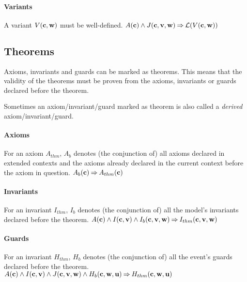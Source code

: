 \paragraph{Variants}
\label{well_definedness_of_variants}
A variant $V(\mathbf{c},\mathbf{w})$ must be well-defined.
%
  {$A(\mathbf{c}) \land J(\mathbf{c},\mathbf{v},\mathbf{w}) \mathbin\Rightarrow \mathcal{L}(V(\mathbf{c},\mathbf{w}))$}


\subsection{Theorems}
\label{theorems}
Axioms, invariants and guards can be marked as theorems. This means that the validity of the theorems must be proven from the axioms, invariants or guards declared before
  the theorem.

Sometimes an axiom/invariant/guard marked as theorem is also called a \emph{derived} axiom/invariant/guard.

\paragraph{Axioms}
\label{axioms_as_theorems}
For an axiom $A_{thm}$, $A_b$ denotes (the conjunction of) all axioms declared
  in extended contexts and the axioms already declared in
  the current context before the axiom in question.
%
  {$A_b(\mathbf{c}) \mathbin\Rightarrow A_{thm}(\mathbf{c})$}

\paragraph{Invariants}
\label{invariants_as_theorems}
For an invariant $I_{thm}$, $I_b$ denotes (the conjunction of) all the model's 
  invariants declared before the theorem.
%
  {$A(\mathbf{c}) \land I(\mathbf{c},\mathbf{v}) \land I_b(\mathbf{c},\mathbf{v},\mathbf{w})
    \mathbin\Rightarrow I_{thm}(\mathbf{c},\mathbf{v},\mathbf{w})$}

\paragraph{Guards}
\label{guards_as_theorems}
For an invariant $H_{thm}$, $H_b$ denotes (the conjunction of) all the event's 
  guards declared before the theorem.
%
  {$A(\mathbf{c}) \land I(\mathbf{c},\mathbf{v}) \land J(\mathbf{c},\mathbf{v},\mathbf{w}) \land
    H_b(\mathbf{c},\mathbf{w},\mathbf{u}) 
    \mathbin\Rightarrow H_{thm}(\mathbf{c},\mathbf{w},\mathbf{u})$}

